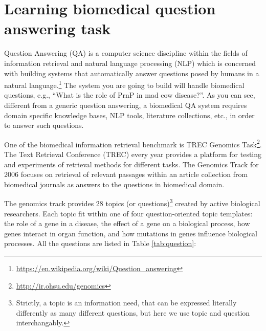 
\section{Learning biomedical question answering task}

Question Answering (QA) is a computer science discipline within the fields of
information retrieval and natural language processing (NLP) which is concerned
with building systems that automatically answer questions posed by humans in a
natural
language.\footnote{\url{https://en.wikipedia.org/wiki/Question_answering}} The
system you are going to build will handle biomedical questions, e.g., ``What is
the role of PrnP in mad cow disease?''. As you can see, different from a generic
question answering, a biomedical QA system requires domain specific knowledge
bases, NLP tools, literature collections, etc., in order to answer such
questions.

One of the biomedical information retrieval benchmark is TREC Genomics
Task\footnote{\url{http://ir.ohsu.edu/genomics}}. The Text Retrieval Conference
(TREC) every year provides a platform for testing and experiments of retrieval
methods for different tasks. The Genomics Track for 2006 focuses on retrieval of
relevant passages within an article collection from biomedical journals as
answers to the questions in biomedical domain.

The genomics track provides 28 topics (or questions)\footnote{Strictly, a topic
is an information need, that can be expressed literally differently as many
different questions, but here we use topic and question interchangably.} created
by active biological researchers. Each topic fit within one of four
question-oriented topic templates: the role of a gene in a disease, the effect
of a gene on a biological process, how genes interact in organ function, and how
mutations in genes influence biological processes. All the questions are listed
in Table \ref{tab:question}:

